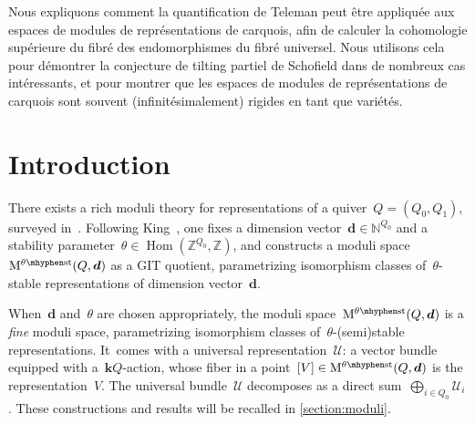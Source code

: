 \documentclass[JEP,XML,SOM,Unicode,NoEqCountersInSection,published]{cedram}
\theoremstyle{plain}
\theoremstyle{definition}
\DeclareMathOperator\Hom{Hom}
\newcommand\field{\mathbf{k}}
\newcommand\moduli{\ensuremath{\mathrm{M}}}
\newcommand\stable{\ensuremath{\mhyphen\mathrm{st}}}
\newcommand\tuple[1]{\ensuremath{{\boldsymbol{#1}}}}
\begin{document}




\begin{altabstract}
Nous expliquons comment la quantification de Teleman peut être appliquée aux espaces de modules de représentations de carquois, afin de calculer la cohomologie supérieure du fibré des endomorphismes du fibré universel. Nous utilisons cela pour démontrer la conjecture de tilting partiel de Schofield dans de nombreux cas intéressants, et pour montrer que les espaces de modules de représentations de carquois sont souvent (infinitésimalement) rigides en tant que variétés.
\end{altabstract}

\maketitle

\tableofcontents
\mainmatter

\section{Introduction}
\label{section:introduction}
There exists a rich moduli theory for representations of a quiver~$Q=(Q_0,Q_1)$,
surveyed in~\cite{MR2484736}.
Following King~\cite{MR1315461},
one fixes a dimension vector~$\tuple{d}\in\mathbb{N}^{Q_0}$
and a stability parameter~$\theta\in\Hom(\mathbb{Z}^{Q_0},\mathbb{Z})$,
and constructs a moduli space~$\moduli^{\theta\stable}(Q,\tuple{d})$ as a GIT quotient,
parametrizing isomorphism classes of~$\theta$-stable representations
of dimension vector~$\tuple{d}$.

When~$\tuple{d}$ and~$\theta$ are chosen appropriately,
the moduli space~$\moduli^{\theta\stable}(Q,\tuple{d})$
is a \emph{fine} moduli space,
parametrizing isomorphism classes of~$\theta$-(semi)stable representations. It~comes with a universal representation~$\mathcal{U}$:
a vector bundle equipped with a~$\field Q$\nobreakdash-action,
whose fiber in a point~$[V]\in\moduli^{\theta\stable}(Q,\tuple{d})$
is the representation~$V$.
The universal bundle~$\mathcal{U}$ decomposes as a direct sum~$\bigoplus_{i\in Q_0}\mathcal{U}_i$.
These constructions and results will be recalled in \cref{section:moduli}.
\end{document}
